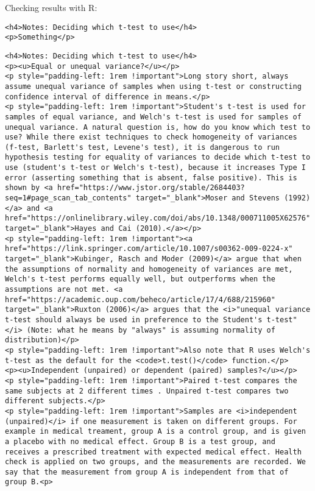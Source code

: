 \documentclass[11pt]{article}
\begin{document}
Checking results with R:

    \begin{verbatim}
<h4>Notes: Deciding which t-test to use</h4>
<p>Something</p>
\end{verbatim}

    \hypertarget{which_to_use}{}

\begin{verbatim}
<h4>Notes: Deciding which t-test to use</h4>
<p><u>Equal or unequal variance?</u></p>
<p style="padding-left: 1rem !important">Long story short, always assume unequal variance of samples when using t-test or constructing confidence interval of difference in means.</p>
<p style="padding-left: 1rem !important">Student's t-test is used for samples of equal variance, and Welch's t-test is used for samples of unequal variance. A natural question is, how do you know which test to use? While there exist techniques to check homogeneity of variances (f-test, Barlett's test, Levene's test), it is dangerous to run hypothesis testing for equality of variances to decide which t-test to use (student's t-test or Welch's t-test), because it increases Type I error (asserting something that is absent, false positive). This is shown by <a href="https://www.jstor.org/stable/2684403?seq=1#page_scan_tab_contents" target="_blank">Moser and Stevens (1992)</a> and <a href="https://onlinelibrary.wiley.com/doi/abs/10.1348/000711005X62576" target="_blank">Hayes and Cai (2010).</a></p>
<p style="padding-left: 1rem !important"><a href="https://link.springer.com/article/10.1007/s00362-009-0224-x" target="_blank">Kubinger, Rasch and Moder (2009)</a> argue that when the assumptions of normality and homogeneity of variances are met, Welch's t-test performs equally well, but outperforms when the assumptions are not met. <a href="https://academic.oup.com/beheco/article/17/4/688/215960" target="_blank">Ruxton (2006)</a> argues that the <i>"unequal variance t-test should always be used in preference to the Student's t-test"</i> (Note: what he means by "always" is assuming normality of distribution)</p>    
<p style="padding-left: 1rem !important">Also note that R uses Welch's t-test as the default for the <code>t.test()</code> function.</p>
<p><u>Independent (unpaired) or dependent (paired) samples?</u></p>
<p style="padding-left: 1rem !important">Paired t-test compares the same subjects at 2 different times . Unpaired t-test compares two different subjects.</p>
<p style="padding-left: 1rem !important">Samples are <i>independent (unpaired)</i> if one measurement is taken on different groups. For example in medical treament, group A is a control group, and is given a placebo with no medical effect. Group B is a test group, and receives a prescribed treatment with expected medical effect. Health check is applied on two groups, and the measurements are recorded. We say that the measurement from group A is independent from that of group B.<p>

\end{verbatim}
\end{document}
